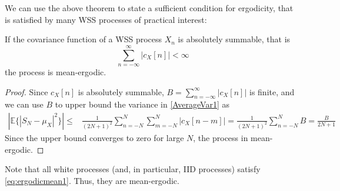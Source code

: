 We can use the above theorem to state a sufficient condition for ergodicity, that is satisfied by many WSS processes of practical interest:

\begin{theorem}

If the covariance function of a WSS process $X_n$ is absolutely summable, that is
\begin{equation}
  \label{eq:ergodicmean1}
  \sum_{n=-\infty}^{\infty} |c_X[n]| <\infty
\end{equation}
the process is mean-ergodic.

\end{theorem}

\begin{proof}

Since $c_X[n]$ is absolutely summable, $B=\sum_{n=-\infty}^{\infty} |c_X[n]|$ is finite, and we can use $B$ to upper bound the variance in \eqref{AverageVar1} as
\begin{align}
\left|\mathbb{E}\{|S_N - \mu_X|^2\} \right|
    \le & \frac{1}{(2N+1)^2} \sum_{n=-N}^N\sum_{m=-N}^N  \left|c_X[n-m]\right|
    =     \frac{1}{(2N+1)^2} \sum_{n=-N}^N B
    =     \frac{B}{2N+1} 
\label{AverageVar1}
\end{align}
Since the upper bound converges to zero for large $N$, the process in mean-ergodic.
\end{proof}

Note that all white processes (and, in particular, IID processes) satisfy \eqref{eq:ergodicmean1}. Thus, they are mean-ergodic.


